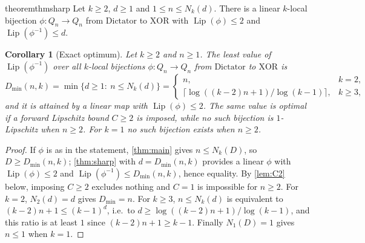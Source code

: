\documentclass[11pt,a4paper]{article}
\theoremstyle{plain}
\newtheorem{corollary}[theorem]{Corollary}
\theoremstyle{definition}
\theoremstyle{remark}
\newcommand{\Lip}{\operatorname{Lip}}
\newcommand{\Dict}{\mathrm{Dictator}}
\newcommand{\XOR}{\mathrm{XOR}}
\begin{document}
\begin{restatable}{theorem}{thmsharp}\label{thm:sharp}
Let $k\ge2$, $d\ge1$ and $1\le n\le N_k(d)$. There is a linear $k$-local bijection $\phi\colon Q_n\to Q_n$ from $\Dict$ to $\XOR$ with $\Lip(\phi)\le2$ and $\Lip(\phi^{-1})\le d$.
\end{restatable}

\begin{corollary}[Exact optimum]\label{cor:exact}
Let $k\ge2$ and $n\ge1$. The least value of $\Lip(\phi^{-1})$ over all $k$-local bijections $\phi\colon Q_n\to Q_n$ from $\Dict$ to $\XOR$ is
\begin{equation}\label{eq:Dmin}
D_{\min}(n,k)=\min\{d\ge1:\ n\le N_k(d)\}=
\begin{cases}
n, & k=2,\\[2pt]
\bigl\lceil \log((k-2)n+1)/\log(k-1)\bigr\rceil, & k\ge3,
\end{cases}
\end{equation}
and it is attained by a linear map with $\Lip(\phi)\le2$. The same value is optimal if a forward Lipschitz bound $C\ge2$ is imposed, while no such bijection is $1$-Lipschitz when $n\ge2$. For $k=1$ no such bijection exists when $n\ge2$.
\end{corollary}
\begin{proof}
If $\phi$ is as in the statement, \cref{thm:main} gives $n\le N_k(D)$, so $D\ge D_{\min}(n,k)$; \cref{thm:sharp} with $d=D_{\min}(n,k)$ provides a linear $\phi$ with $\Lip(\phi)\le2$ and $\Lip(\phi^{-1})\le D_{\min}(n,k)$, hence equality. By \cref{lem:C2} below, imposing $C\ge2$ excludes nothing and $C=1$ is impossible for $n\ge2$. For $k=2$, $N_2(d)=d$ gives $D_{\min}=n$. For $k\ge3$, $n\le N_k(d)$ is equivalent to $(k-2)n+1\le(k-1)^d$, i.e.\ to $d\ge\log((k-2)n+1)/\log(k-1)$, and this ratio is at least $1$ since $(k-2)n+1\ge k-1$. Finally $N_1(D)=1$ gives $n\le1$ when $k=1$.
\end{proof}
\end{document}

